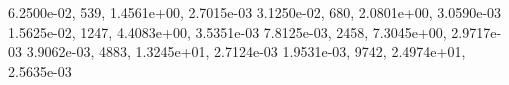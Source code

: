6.2500e-02,   539, 1.4561e+00, 2.7015e-03 
3.1250e-02,   680, 2.0801e+00, 3.0590e-03 
1.5625e-02,  1247, 4.4083e+00, 3.5351e-03 
7.8125e-03,  2458, 7.3045e+00, 2.9717e-03 
3.9062e-03,  4883, 1.3245e+01, 2.7124e-03 
1.9531e-03,  9742, 2.4974e+01, 2.5635e-03 

